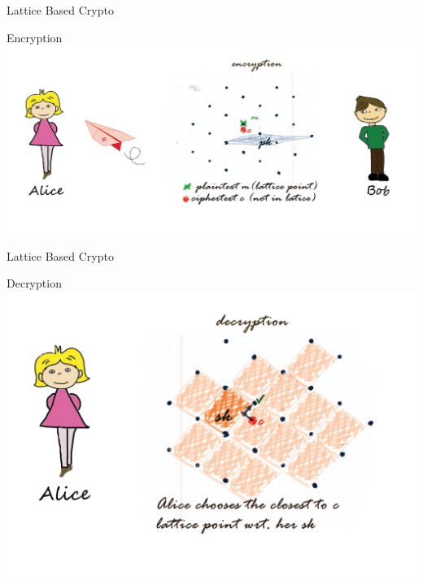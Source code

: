 \begin{frame}{Lattice Based Crypto}
    \begin{block}{Encryption}
        \centering
        \includegraphics[keepaspectratio,width=\textwidth,height=0.8\textheight]{data/encryption}
    \end{block}
\end{frame}

\begin{frame}{Lattice Based Crypto}
    \begin{block}{Decryption}
        \centering
        \includegraphics[keepaspectratio,width=\textwidth,height=0.8\textheight]{data/decryption}
    \end{block}
\end{frame}

